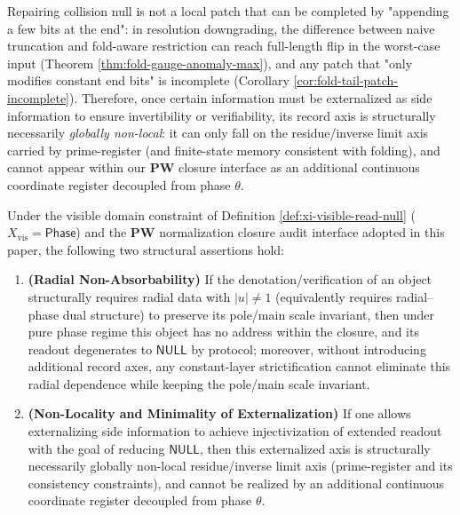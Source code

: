\begin{remark}\label{rem:xi-register-minimality-no-tail-patch}
Repairing collision null is not a local patch that can be completed by "appending a few bits at the end": in resolution downgrading, the difference between naive truncation and fold-aware restriction can reach full-length flip in the worst-case input (Theorem \ref{thm:fold-gauge-anomaly-max}), and any patch that "only modifies constant end bits" is incomplete (Corollary \ref{cor:fold-tail-patch-incomplete}).
Therefore, once certain information must be externalized as side information to ensure invertibility or verifiability, its record axis is structurally necessarily \emph{globally non-local}: it can only fall on the residue/inverse limit axis carried by prime-register (and finite-state memory consistent with folding), and cannot appear within our \(\mathbf{PW}\) closure interface as an additional continuous coordinate register decoupled from phase \(\theta\).
\end{remark}

\begin{theorem}\label{thm:xi-pw-no-continuous-hair}
Under the visible domain constraint of Definition \ref{def:xi-visible-read-null} (\(X_{\mathrm{vis}}=\mathsf{Phase}\)) and the \(\mathbf{PW}\) normalization closure audit interface adopted in this paper, the following two structural assertions hold:
\begin{enumerate}
  \item \textbf{(Radial Non-Absorbability)}
  If the denotation/verification of an object structurally requires radial data with \(|u|\neq 1\) (equivalently requires radial–phase dual structure) to preserve its pole/main scale invariant, then under pure phase regime this object has no address within the closure, and its readout degenerates to \(\mathsf{NULL}\) by protocol; moreover, without introducing additional record axes, any constant-layer strictification cannot eliminate this radial dependence while keeping the pole/main scale invariant.
  \item \textbf{(Non-Locality and Minimality of Externalization)}
  If one allows externalizing side information to achieve injectivization of extended readout with the goal of reducing \(\mathsf{NULL}\), then this externalized axis is structurally necessarily globally non-local residue/inverse limit axis (prime-register and its consistency constraints), and cannot be realized by an additional continuous coordinate register decoupled from phase \(\theta\).
\end{enumerate}
\end{theorem}

